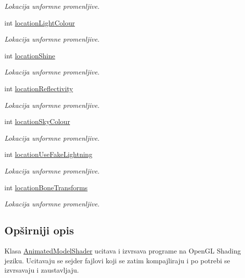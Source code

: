 \begin{DoxyCompactItemize}
\begin{DoxyCompactList}\small\item\em Lokacija unformne promenljive. \end{DoxyCompactList}\item 
int \hyperlink{classshader_1_1AnimatedModelShader_aa5245f948a0251d25b23756510b71b6b}{location\+Light\+Colour}
\begin{DoxyCompactList}\small\item\em Lokacija unformne promenljive. \end{DoxyCompactList}\item 
int \hyperlink{classshader_1_1AnimatedModelShader_aae47bf14174ed52dd1f9222109f577f7}{location\+Shine}
\begin{DoxyCompactList}\small\item\em Lokacija unformne promenljive. \end{DoxyCompactList}\item 
int \hyperlink{classshader_1_1AnimatedModelShader_a84709b6c7a0fbdf5f884b04d98675b4b}{location\+Reflectivity}
\begin{DoxyCompactList}\small\item\em Lokacija unformne promenljive. \end{DoxyCompactList}\item 
int \hyperlink{classshader_1_1AnimatedModelShader_aefe350445a9e350d1dd43c5e4476d2b7}{location\+Sky\+Colour}
\begin{DoxyCompactList}\small\item\em Lokacija unformne promenljive. \end{DoxyCompactList}\item 
int \hyperlink{classshader_1_1AnimatedModelShader_abe7d5a2990e677ed50f949de920d8720}{location\+Use\+Fake\+Lightning}
\begin{DoxyCompactList}\small\item\em Lokacija unformne promenljive. \end{DoxyCompactList}\item 
int \hyperlink{classshader_1_1AnimatedModelShader_abd8d6ec1ef7db97975d80c8c2a80cd94}{location\+Bone\+Transforms}
\begin{DoxyCompactList}\small\item\em Lokacija unformne promenljive. \end{DoxyCompactList}\end{DoxyCompactItemize}


\subsection{Opširniji opis}
Klasa \hyperlink{classshader_1_1AnimatedModelShader}{Animated\+Model\+Shader} ucitava i izvrsava programe na Open\+GL Shading jeziku. Ucitavaju se sejder fajlovi koji se zatim kompajliraju i po potrebi se izvrsavaju i zaustavljaju. 

